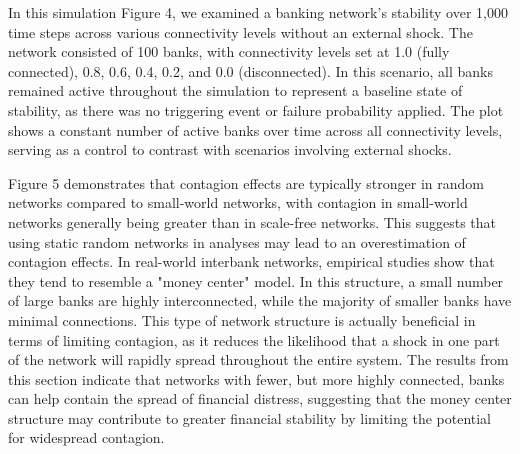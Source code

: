 \documentclass{article} %
\begin{document}
In this simulation Figure 4, we examined a banking network's stability over 1,000 time steps across various connectivity levels without an external shock. The network consisted of 100 banks, with connectivity levels set at 1.0 (fully connected), 0.8, 0.6, 0.4, 0.2, and 0.0 (disconnected). In this scenario, all banks remained active throughout the simulation to represent a baseline state of stability, as there was no triggering event or failure probability applied. The plot shows a constant number of active banks over time across all connectivity levels, serving as a control to contrast with scenarios involving external shocks.

Figure 5 demonstrates that contagion effects are typically stronger in random networks compared to small-world networks, with contagion in small-world networks generally being greater than in scale-free networks. This suggests that using static random networks in analyses may lead to an overestimation of contagion effects. In real-world interbank networks, empirical studies show that they tend to resemble a "money center" model. In this structure, a small number of large banks are highly interconnected, while the majority of smaller banks have minimal connections. This type of network structure is actually beneficial in terms of limiting contagion, as it reduces the likelihood that a shock in one part of the network will rapidly spread throughout the entire system. The results from this section indicate that networks with fewer, but more highly connected, banks can help contain the spread of financial distress, suggesting that the money center structure may contribute to greater financial stability by limiting the potential for widespread contagion.
\end{document}
